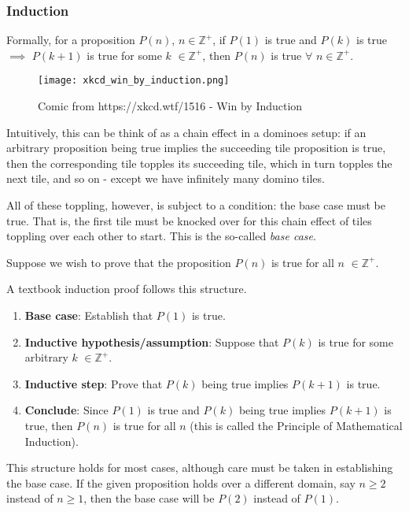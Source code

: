 \documentclass[../main.tex]{subfiles}
\begin{document}
\subsubsection{Induction}
Formally, for a proposition $P(n)$, $n\in\mathbb{Z}^+$, if $P(1)$ is true and $P(k)$ is true $\implies$ $P(k+1)$ is true for some $k$ $\in\mathbb{Z}^+$, then $P(n)$ is true $\forall$ $n\in\mathbb{Z}^+$.
\begin{figure}[H]
    \centering
    \texttt{[image: xkcd\_win\_by\_induction.png]}
    \caption{Comic from https://xkcd.wtf/1516 - Win by Induction}
\end{figure}
Intuitively, this can be think of as a chain effect in a dominoes setup: if an arbitrary proposition being true implies the succeeding tile proposition is true, then the corresponding tile topples its succeeding tile, which in turn topples the next tile, and so on - except we have infinitely many domino tiles.

All of these toppling, however, is subject to a condition: the base case must be true. That is, the first tile must be knocked over for this chain effect of tiles toppling over each other to start. This is the so-called \textit{base case}.

Suppose we wish to prove that the proposition $P(n)$ is true for all $n$ $\in\mathbb{Z}^+$. 
\begin{proposition}
    A textbook induction proof follows this structure.
\begin{enumerate}
    \item \textbf{Base case}: Establish that $P(1)$ is true.
    \item \textbf{Inductive hypothesis/assumption}: Suppose that $P(k)$ is true for some arbitrary $k$ $\in\mathbb{Z}^+$. 
    \item \textbf{Inductive step}: Prove that $P(k)$ being true implies $P(k+1)$ is true. 
    \item \textbf{Conclude}: Since $P(1)$ is true and $P(k)$ being true implies $P(k+1)$ is true, then $P(n)$ is true for all $n$ (this is called the Principle of Mathematical Induction).
\end{enumerate}
\end{proposition}
This structure holds for most cases, although care must be taken in establishing the base case. If the given proposition holds over a different domain, say $n\geq 2$ instead of $n\geq 1$, then the base case will be $P(2)$ instead of $P(1)$.
\end{document}
